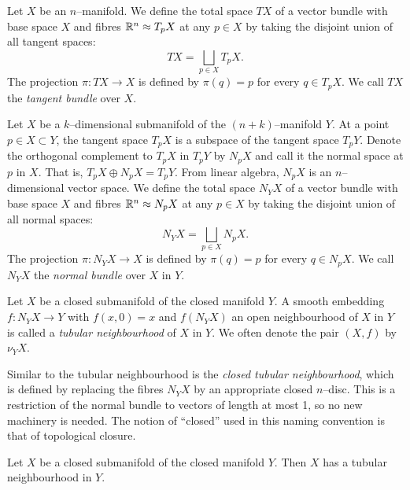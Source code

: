 \begin{defn}
	Let $X$ be an $n$--manifold.
	We define the total space $TX$ of a vector bundle with base space $X$ and fibres $\mathbb{R}^n\approx T_p X$ at any $p\in X$ by taking the disjoint union of all tangent spaces:
	\[
		TX = \bigsqcup_{p\in X} T_p X.
	\]
	The projection $\pi:TX\to X$ is defined by $\pi(q)=p$ for every $q\in T_p X$.
	We call $TX$ the \emph{tangent bundle} over $X$.
\end{defn}

\begin{defn}
	Let $X$ be a $k$--dimensional submanifold of the $(n+k)$--manifold $Y$.
	At a point $p\in X\subset Y$, the tangent space $T_p X$ is a subspace of the tangent space $T_p Y$.
	Denote the orthogonal complement to $T_p X$ in $T_p Y$ by $N_p X$ and call it the normal space at $p$ in $X$.
	That is, $T_p X\oplus N_p X = T_p Y$.
	From linear algebra, $N_p X$ is an $n$--dimensional vector space.
	We define the total space $N_Y X$ of a vector bundle with base space $X$ and fibres $\mathbb{R}^n\approx N_p X$ at any $p\in X$ by taking the disjoint union of all normal spaces:
	\[
		N_Y X = \bigsqcup_{p\in X} N_p X.
	\]
	The projection $\pi:N_Y X\to X$ is defined by $\pi(q)=p$ for every $q\in N_p X$.
	We call $N_Y X$ the \emph{normal bundle} over $X$ in $Y$.	
\end{defn}

\begin{defn}
	\label{def:tubularneighbourhood}
	Let $X$ be a closed submanifold of the closed manifold $Y$.
	A smooth embedding $f:N_Y X\to Y$ with $f(x,0)=x$ and $f(N_Y X)$ an open neighbourhood of $X$ in $Y$ is called a \emph{tubular neighbourhood} of $X$ in $Y$.
	We often denote the pair $(X,f)$ by $\nu_Y X$.
\end{defn}

Similar to the tubular neighbourhood is the \emph{closed tubular neighbourhood}, which is defined by replacing the fibres $N_Y X$ by an appropriate closed $n$--disc.
This is a restriction of the normal bundle to vectors of length at most 1, so no new machinery is needed.
The notion of ``closed'' used in this naming convention is that of topological closure.

\begin{theorem}
	\label{thm:tubularneighbourhood}
	Let $X$ be a closed submanifold of the closed manifold $Y$.
	Then $X$ has a tubular neighbourhood in $Y$.
\end{theorem}

